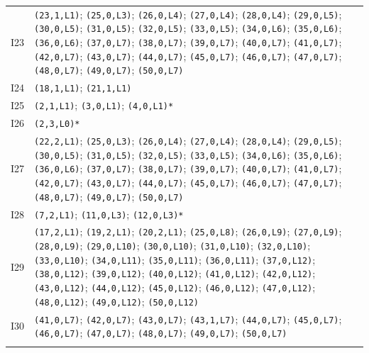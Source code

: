 {\begin{longtable}{@{}r p{14.7cm}@{}}
I23 & \texttt{(23,1,L1)}; \texttt{(25,0,L3)}; \texttt{(26,0,L4)}; \texttt{(27,0,L4)}; \texttt{(28,0,L4)}; \texttt{(29,0,L5)}; \texttt{(30,0,L5)}; \texttt{(31,0,L5)}; \texttt{(32,0,L5)}; \texttt{(33,0,L5)}; \texttt{(34,0,L6)}; \texttt{(35,0,L6)}; \texttt{(36,0,L6)}; \texttt{(37,0,L7)}; \texttt{(38,0,L7)}; \texttt{(39,0,L7)}; \texttt{(40,0,L7)}; \texttt{(41,0,L7)}; \texttt{(42,0,L7)}; \texttt{(43,0,L7)}; \texttt{(44,0,L7)}; \texttt{(45,0,L7)}; \texttt{(46,0,L7)}; \texttt{(47,0,L7)}; \texttt{(48,0,L7)}; \texttt{(49,0,L7)}; \texttt{(50,0,L7)}\\\addlinespace[3pt]
I24 & \texttt{(18,1,L1)}; \texttt{(21,1,L1)}\\\addlinespace[3pt]
I25 & \texttt{(2,1,L1)}; \texttt{(3,0,L1)}; \texttt{(4,0,L1)*}\\\addlinespace[3pt]
I26 & \texttt{(2,3,L0)*}\\\addlinespace[3pt]
I27 & \texttt{(22,2,L1)}; \texttt{(25,0,L3)}; \texttt{(26,0,L4)}; \texttt{(27,0,L4)}; \texttt{(28,0,L4)}; \texttt{(29,0,L5)}; \texttt{(30,0,L5)}; \texttt{(31,0,L5)}; \texttt{(32,0,L5)}; \texttt{(33,0,L5)}; \texttt{(34,0,L6)}; \texttt{(35,0,L6)}; \texttt{(36,0,L6)}; \texttt{(37,0,L7)}; \texttt{(38,0,L7)}; \texttt{(39,0,L7)}; \texttt{(40,0,L7)}; \texttt{(41,0,L7)}; \texttt{(42,0,L7)}; \texttt{(43,0,L7)}; \texttt{(44,0,L7)}; \texttt{(45,0,L7)}; \texttt{(46,0,L7)}; \texttt{(47,0,L7)}; \texttt{(48,0,L7)}; \texttt{(49,0,L7)}; \texttt{(50,0,L7)}\\\addlinespace[3pt]
I28 & \texttt{(7,2,L1)}; \texttt{(11,0,L3)}; \texttt{(12,0,L3)*}\\\addlinespace[3pt]
I29 & \texttt{(17,2,L1)}; \texttt{(19,2,L1)}; \texttt{(20,2,L1)}; \texttt{(25,0,L8)}; \texttt{(26,0,L9)}; \texttt{(27,0,L9)}; \texttt{(28,0,L9)}; \texttt{(29,0,L10)}; \texttt{(30,0,L10)}; \texttt{(31,0,L10)}; \texttt{(32,0,L10)}; \texttt{(33,0,L10)}; \texttt{(34,0,L11)}; \texttt{(35,0,L11)}; \texttt{(36,0,L11)}; \texttt{(37,0,L12)}; \texttt{(38,0,L12)}; \texttt{(39,0,L12)}; \texttt{(40,0,L12)}; \texttt{(41,0,L12)}; \texttt{(42,0,L12)}; \texttt{(43,0,L12)}; \texttt{(44,0,L12)}; \texttt{(45,0,L12)}; \texttt{(46,0,L12)}; \texttt{(47,0,L12)}; \texttt{(48,0,L12)}; \texttt{(49,0,L12)}; \texttt{(50,0,L12)}\\\addlinespace[3pt]
I30 & \texttt{(41,0,L7)}; \texttt{(42,0,L7)}; \texttt{(43,0,L7)}; \texttt{(43,1,L7)}; \texttt{(44,0,L7)}; \texttt{(45,0,L7)}; \texttt{(46,0,L7)}; \texttt{(47,0,L7)}; \texttt{(48,0,L7)}; \texttt{(49,0,L7)}; \texttt{(50,0,L7)}\\\addlinespace[3pt]

\end{longtable}}
